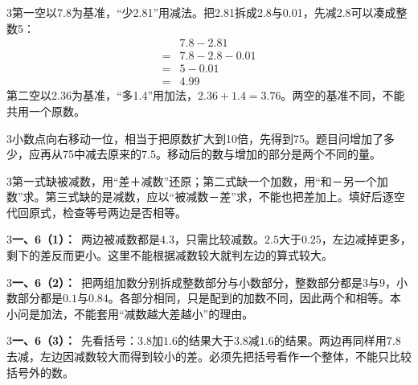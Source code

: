 \documentclass[multi=snippet,border={5bp 20bp 5bp 5bp}]{standalone}
\newenvironment{snippet}[3]{\begin{minipage}{#1bp}\color{answerred}\fontsize{#2}{#3}\selectfont\raggedright}{\end{minipage}}
\begin{document}
\begin{snippet}{505}{11.5}{14}\begin{multicols}{3}\raggedcolumns 第一空以7.8为基准，“少2.81”用减法。把2.81拆成2.8与0.01，先减2.8可以凑成整数5：\[\begin{aligned}&7.8-2.81\\={}&7.8-2.8-0.01\\={}&5-0.01\\={}&4.99\end{aligned}\]第二空以2.36为基准，“多1.4”用加法，\(2.36+1.4=3.76\)\allowbreak 。两空的基准不同，不能共用一个原数。\end{multicols}\end{snippet}
\begin{snippet}{505}{11.5}{14}\begin{multicols}{3}\raggedcolumns 小数点向右移动一位，相当于把原数扩大到10倍，先得到75。题目问增加了多少，应再从75中减去原来的\(7.5\)\allowbreak 。移动后的数与增加的部分是两个不同的量。\end{multicols}\end{snippet}
\begin{snippet}{505}{11.5}{14}\begin{multicols}{3}\raggedcolumns 第一式缺被减数，用“差＋减数”还原；第二式缺一个加数，用“和－另一个加数”求。第三式缺的是减数，应以“被减数－差”求，不能也把差加上。填好后逐空代回原式，检查等号两边是否相等。\end{multicols}\end{snippet}
\begin{snippet}{505}{11.5}{14}\begin{multicols}{3}\raggedcolumns \textbf{一、6（1）：}\ 两边被减数都是\(4.3\)\allowbreak ，只需比较减数。\(2.5\)\allowbreak 大于\(0.25\)\allowbreak ，左边减掉更多，剩下的差反而更小。这里不能根据减数较大就判左边的算式较大。\end{multicols}\end{snippet}
\begin{snippet}{505}{11.5}{14}\begin{multicols}{3}\raggedcolumns \textbf{一、6（2）：}\ 把两组加数分别拆成整数部分与小数部分，整数部分都是3与9，小数部分都是\(0.1\)\allowbreak 与\(0.84\)\allowbreak 。各部分相同，只是配到的加数不同，因此两个和相等。本小问是加法，不能套用“减数越大差越小”的理由。\end{multicols}\end{snippet}
\begin{snippet}{505}{11.5}{14}\begin{multicols}{3}\raggedcolumns \textbf{一、6（3）：}\ 先看括号：\(3.8\)\allowbreak 加\(1.6\)\allowbreak 的结果大于\(3.8\)\allowbreak 减\(1.6\)\allowbreak 的结果。两边再同样用\(7.8\)\allowbreak 去减，左边因减数较大而得到较小的差。必须先把括号看作一个整体，不能只比较括号外的数。\end{multicols}\end{snippet}
\end{document}
